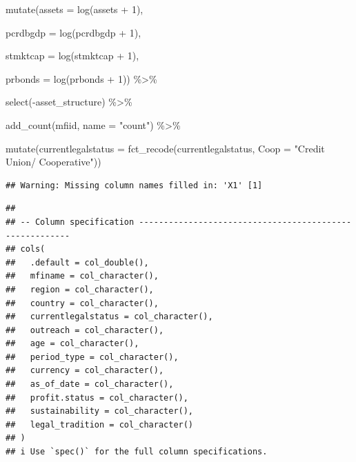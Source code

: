 \documentclass[a4paper,nobind]{templates/ociamthesis}
\newenvironment{Shaded}{\begin{snugshade}}{\end{snugshade}}
\newcommand{\AttributeTok}[1]{\textcolor[rgb]{0.77,0.63,0.00}{#1}}
\newcommand{\DecValTok}[1]{\textcolor[rgb]{0.00,0.00,0.81}{#1}}
\newcommand{\FunctionTok}[1]{\textcolor[rgb]{0.00,0.00,0.00}{#1}}
\newcommand{\NormalTok}[1]{#1}
\newcommand{\SpecialCharTok}[1]{\textcolor[rgb]{0.00,0.00,0.00}{#1}}
\newcommand{\StringTok}[1]{\textcolor[rgb]{0.31,0.60,0.02}{#1}}
\renewenvironment{Shaded}
{
  \vspace{10pt}%
  \begin{snugshade}%
}{%
  \end{snugshade}%
  \vspace{8pt}%
}
\begin{document}
\begin{Shaded}
\begin{Highlighting}[]
  \FunctionTok{mutate}\NormalTok{(}\AttributeTok{assets =} \FunctionTok{log}\NormalTok{(assets }\SpecialCharTok{+} \DecValTok{1}\NormalTok{),}
         
         \AttributeTok{pcrdbgdp =} \FunctionTok{log}\NormalTok{(pcrdbgdp }\SpecialCharTok{+} \DecValTok{1}\NormalTok{),}
         
         \AttributeTok{stmktcap =} \FunctionTok{log}\NormalTok{(stmktcap }\SpecialCharTok{+} \DecValTok{1}\NormalTok{),}
         
         \AttributeTok{prbonds =} \FunctionTok{log}\NormalTok{(prbonds }\SpecialCharTok{+} \DecValTok{1}\NormalTok{)) }\SpecialCharTok{\%\textgreater{}\%} 
  
  \FunctionTok{select}\NormalTok{(}\SpecialCharTok{{-}}\NormalTok{asset\_structure) }\SpecialCharTok{\%\textgreater{}\%} 
  
  \FunctionTok{add\_count}\NormalTok{(mfiid, }\AttributeTok{name =} \StringTok{"count"}\NormalTok{) }\SpecialCharTok{\%\textgreater{}\%} 
  
  \FunctionTok{mutate}\NormalTok{(}\AttributeTok{currentlegalstatus =} \FunctionTok{fct\_recode}\NormalTok{(currentlegalstatus, }\AttributeTok{Coop =} \StringTok{"Credit Union/ Cooperative"}\NormalTok{))}
\end{Highlighting}
\end{Shaded}

\begin{verbatim}
## Warning: Missing column names filled in: 'X1' [1]
\end{verbatim}

\begin{verbatim}
## 
## -- Column specification --------------------------------------------------------
## cols(
##   .default = col_double(),
##   mfiname = col_character(),
##   region = col_character(),
##   country = col_character(),
##   currentlegalstatus = col_character(),
##   outreach = col_character(),
##   age = col_character(),
##   period_type = col_character(),
##   currency = col_character(),
##   as_of_date = col_character(),
##   profit.status = col_character(),
##   sustainability = col_character(),
##   legal_tradition = col_character()
## )
## i Use `spec()` for the full column specifications.
\end{verbatim}
\end{document}
